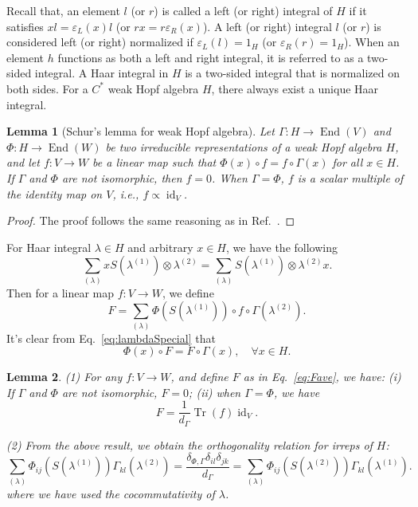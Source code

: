 \documentclass[a4paper,11pt]{article}
\theoremstyle{theorem}
\newtheorem{lemma}{Lemma}
\theoremstyle{remark}
\newcommand{\cone}{(1)}
\newcommand{\ctwo}{(2)}
\newcommand\Tr{\operatorname{Tr}}
\newcommand{\id}{\operatorname{id}}
\newcommand{\End}{\operatorname{End}}
\begin{document}
Recall that, an element \( l \) (or \( r \)) is called a left (or right) integral of \( H \) if it satisfies \( xl = \varepsilon_L(x) l \) (or \( rx = r\varepsilon_R(x) \)). A left (or right) integral \( l \) (or \( r \)) is considered left (or right) normalized if \( \varepsilon_L(l) = 1_H \) (or \( \varepsilon_R(r) = 1_H \)). When an element \( h \) functions as both a left and right integral, it is referred to as a two-sided integral. A Haar integral in \( H \) is a two-sided integral that is normalized on both sides. For a $C^*$ weak Hopf algebra $H$, there always exist a unique Haar integral.

\begin{lemma}[Schur's lemma for weak Hopf algebra]\label{prop:schur} 
Let $\Gamma: H \to \End(V)$ and $\Phi: H \to \End(W)$ be two irreducible representations of a weak Hopf algebra $H$, and let $f: V \to W$ be a linear map such that $\Phi(x) \circ f = f \circ \Gamma(x)$ for all $x \in H$. If $\Gamma$ and $\Phi$ are not isomorphic, then $f = 0$. When $\Gamma= \Phi$, $f$ is a scalar multiple of the identity map on $V$, i.e., $f \propto \id_V$. 
\end{lemma}

\begin{proof}
The proof follows the same reasoning as in Ref.~\cite{jia2024generalized}.
\end{proof}

For Haar integral $\lambda\in H$ and arbitrary $x\in H$, we have the following \cite{BOHM1998weak,Nikshych2004semisimpleWHA}
\begin{equation}\label{eq:lambdaSpecial}
  \sum_{(\lambda)}  xS(\lambda^{(1)})\otimes \lambda^{(2)}=  \sum_{(\lambda)} 
 S(\lambda^{(1)})\otimes \lambda^{(2)}x.
\end{equation}
Then for a linear map $f: V\to W$, we define
\begin{equation}\label{eq:Fave}
    F=\sum_{(\lambda)} \Phi(S(\lambda^{(1)})) \circ f \circ \Gamma(\lambda^{\ctwo}).
\end{equation}
It's clear from Eq.~\eqref{eq:lambdaSpecial} that
\begin{equation}
   \Phi(x) \circ F =F\circ \Gamma(x),\quad \forall x\in H.
\end{equation}


\begin{lemma}\label{prop:orthgonality}
 (1)  For any $f:V\to W$, and define $F$ as in Eq.~\eqref{eq:Fave}, we have: (i)  If $\Gamma$ and $\Phi$ are not isomorphic, $F=0$; (ii) when $\Gamma=\Phi$, we have
    \begin{equation}\label{eq:Ftrace}
        F=\frac{1}{d_{\Gamma}}\Tr (f) \id_V.
    \end{equation}
    
(2) From the above result, we obtain the orthogonality relation for irreps of $H$:
\begin{equation}
    \sum_{(\lambda)} \Phi_{ij}(S(\lambda^{\cone})) \Gamma_{kl}(\lambda^{\ctwo})=\frac{\delta_{\Phi,\Gamma} \delta_{il}\delta_{jk} }{d_{\Gamma}}=  \sum_{(\lambda)} \Phi_{ij}(S(\lambda^{\ctwo})) \Gamma_{kl}(\lambda^{\cone}).
\end{equation}
where we have used the cocommutativity of $\lambda$.
\end{lemma}
\end{document}
